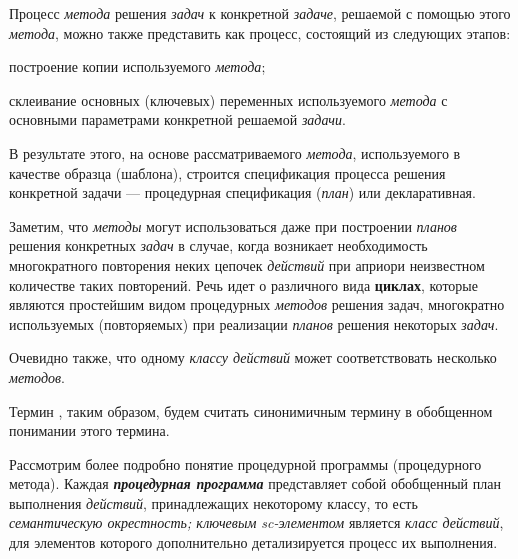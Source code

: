 Процесс  \textit{метода} решения \textit{задач} к конкретной \textit{задаче}, решаемой с помощью этого \textit{метода}, можно также представить как процесс, состоящий из следующих этапов:
\begin{textitemize}
	\item построение копии используемого \textit{метода};
	\item склеивание основных (ключевых) переменных используемого \textit{метода} с основными параметрами конкретной решаемой \textit{задачи}.
\end{textitemize}

В результате этого, на основе рассматриваемого \textit{метода}, используемого в качестве образца (шаблона), строится спецификация процесса решения конкретной задачи --- процедурная спецификация (\textit{план}) или декларативная.

Заметим, что \textit{методы} могут использоваться даже при построении \textit{планов} решения конкретных \textit{задач} в случае, когда возникает необходимость многократного повторения неких цепочек \textit{действий} при априори неизвестном количестве таких повторений. Речь идет о различного вида \textbf{циклах}, которые являются простейшим видом процедурных \textit{методов} решения задач, многократно используемых (повторяемых) при реализации \textit{планов} решения некоторых \textit{задач}.

Очевидно также, что одному \textit{классу действий} может соответствовать несколько \textit{методов}.

Термин , таким образом, будем считать синонимичным термину  в обобщенном понимании этого термина.

\begin{SCn}
	\begin{scnindent}
	\end{scnindent}
\end{SCn}

Рассмотрим более подробно понятие процедурной программы (процедурного метода). Каждая \textbf{\textit{процедурная программа}} представляет собой обобщенный план выполнения \textit{действий}, принадлежащих некоторому классу, то есть \textit{семантическую окрестность; ключевым sc-элементом\scnrolesign} является \textit{класс действий}, для элементов которого дополнительно детализируется процесс их выполнения.

